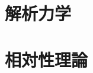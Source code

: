 \documentclass[a4j]{jsbook}
\begin{document}
%
%

%
%
%
%
\chapter{解析力学}





%
%
%
%
\chapter{相対性理論}



\end{document}
